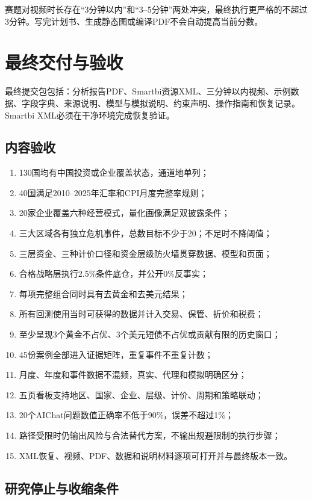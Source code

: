 \documentclass[UTF8,fontset=windows,12pt,openany]{ctexbook}
\begin{document}
赛题对视频时长存在“3分钟以内”和“3--5分钟”两处冲突，最终执行更严格的不超过3分钟。写完计划书、生成静态图或编译PDF不会自动提高当前分数。

\chapter{最终交付与验收}

最终提交包包括：分析报告PDF、Smartbi资源XML、三分钟以内视频、示例数据、字段字典、来源说明、模型与模拟说明、约束声明、操作指南和恢复记录。Smartbi XML必须在干净环境完成恢复验证。

\section{内容验收}

\begin{enumerate}[label=\ensuremath{\square}]
  \item 130国均有中国投资或企业覆盖状态，通道地单列；
  \item 40国满足2010--2025年汇率和CPI月度完整率规则；
  \item 20家企业覆盖六种经营模式，量化画像满足双披露条件；
  \item 三大区域各有独立危机事件，总数目标不少于20；不足时不降阈值；
  \item 三层资金、三种计价口径和资金层级防火墙贯穿数据、模型和页面；
  \item 合格战略层执行2.5\%条件底仓，并公开0\%反事实；
  \item 每项完整组合同时具有去黄金和去美元结果；
  \item 所有回测使用当时可获得的数据并计入交易、保管、折价和税费；
  \item 至少呈现3个黄金不占优、3个美元短债不占优或贡献有限的历史窗口；
  \item 45份案例全部进入证据矩阵，重复事件不重复计数；
  \item 月度、年度和事件数据不混频，真实、代理和模拟明确区分；
  \item 五页看板支持地区、国家、企业、层级、计价、周期和策略联动；
  \item 20个AIChat问题数值正确率不低于90\%，误差不超过1\%；
  \item 路径受限时仍输出风险与合法替代方案，不输出规避限制的执行步骤；
  \item XML恢复、视频、PDF、数据和说明材料逐项可打开并与最终版本一致。
\end{enumerate}

\section{研究停止与收缩条件}
\end{document}
